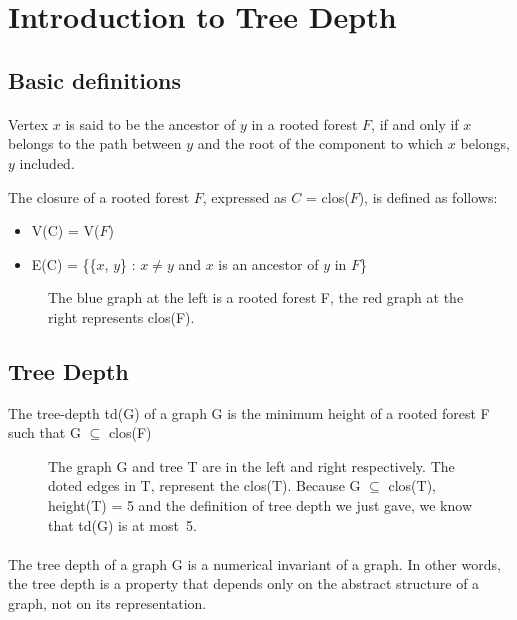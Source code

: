 \section{Introduction to Tree Depth}

\subsection{Basic definitions}

\paragraph{}
Vertex $x$ is said to be the ancestor of $y$ in a rooted forest $F$, if and only if $x$ belongs to the path between $y$ and the root of the component to which $x$ belongs, $y$ included.

\begin{definition}
The closure of a rooted forest $F$, expressed as $C$ = clos($F$), is defined as follows:
\begin{itemize}
  \item V(C) = V($F$)
  \item E(C) = \{\{$x$, $y$\} : $x \neq y$ and $x$ is an ancestor of $y$ in $F$\}
\end{itemize}
\end{definition}
\begin{figure}[h]

\caption{The blue graph at the left is a rooted forest F, the red graph at the right represents clos(F).}
\end{figure}

\subsection{Tree Depth}

\begin{definition}
The tree-depth td(G) of a graph G is the minimum height of a rooted forest F such that G $\subseteq$ clos(F)
\end{definition}

\begin{figure}[H]

\caption{The graph G and tree T are in the left and right respectively. The doted edges in T, represent the clos(T). Because G $\subseteq$ clos(T), height(T) = 5 and the definition of tree depth we just gave, we know that td(G) is at most~5.\label{fig:3d-cube}}
\end{figure}
\paragraph{}
The tree depth of a graph G is a numerical invariant of a graph. In other words, the tree depth is a property that depends only  on the abstract structure of a graph, not on its representation.	

